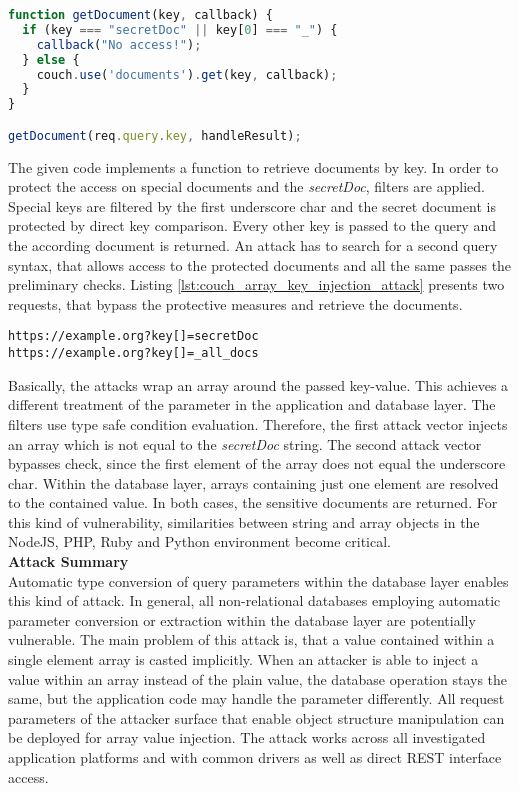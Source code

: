 \begin{lstlisting}[caption={Vulnerable NodeJS example for array key injection against CouchDB}, label={lst:couch_array_key_injection}, language=JavaScript]
function getDocument(key, callback) {
  if (key === "secretDoc" || key[0] === "_") {
    callback("No access!");
  } else {
    couch.use('documents').get(key, callback);
  }
}

getDocument(req.query.key, handleResult);
\end{lstlisting}

The given code implements a function to retrieve documents by key. In order to protect the access on special documents and the \emph{secretDoc}, filters are applied. Special keys are filtered by the first underscore char and the secret document is protected by direct key comparison. Every other key is passed to the query and the according document is returned. An attack has to search for a second query syntax, that allows access to the protected documents and all the same passes the preliminary checks. Listing \ref{lst:couch_array_key_injection_attack} presents two requests, that bypass the protective measures and retrieve the documents. \\

\begin{lstlisting}[caption={Attack vectors against CouchDB for array key injection via the query-string parameter}, label={lst:couch_array_key_injection_attack}]
https://example.org?key[]=secretDoc
https://example.org?key[]=_all_docs
\end{lstlisting}

Basically, the attacks wrap an array around the passed key-value. This achieves a different treatment of the parameter in the application and database layer. The filters use type safe condition evaluation. Therefore, the first attack vector injects an array which is not equal to the \emph{secretDoc} string. The second attack vector bypasses check, since the first element of the array does not equal the underscore char. Within the database layer, arrays containing just one element are resolved to the contained value. In both cases, the sensitive documents are returned. For this kind of vulnerability, similarities between string and array objects in the NodeJS, PHP, Ruby and Python environment become critical. \\

\textbf{Attack Summary} \\
Automatic type conversion of query parameters within the database layer enables this kind of attack. In general, all non-relational databases employing automatic parameter conversion or extraction within the database layer are potentially vulnerable. The main problem of this attack is, that a value contained within a single element array is casted implicitly. When an attacker is able to inject a value within an array instead of the plain value, the database operation stays the same, but the application code may handle the parameter differently. All request parameters of the attacker surface that enable object structure manipulation can be deployed for array value injection. The attack works across all investigated application platforms and with common drivers as well as direct REST interface access. 

